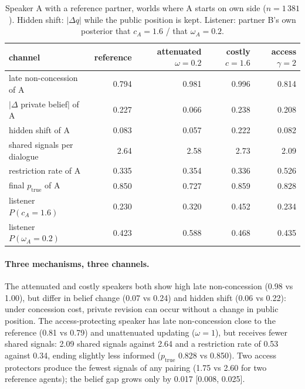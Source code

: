 \documentclass[runningheads]{llncs}
\newcommand{\Etrue}{p_{\mathrm{true}}}
\begin{document}
\begin{table}[t]
\centering\caption{Speaker A with a reference partner, worlds where A starts on own side ($n=1\,381$). Hidden shift: $|\Delta q|$ while the public position is kept. Listener: partner B's own posterior that $c_A=1.6$ / that $\omega_A=0.2$.}
\label{tab:channels}
\footnotesize
\begin{tabular}{@{}lrrrr@{}}
\toprule
channel & reference & attenuated $\omega{=}0.2$ & costly $c{=}1.6$ & access $\gamma{=}2$\\
\midrule
late non-concession of A & 0.794 & 0.981 & 0.996 & 0.814\\
$|\Delta$ private belief$|$ of A & 0.227 & 0.066 & 0.238 & 0.208\\
hidden shift of A & 0.083 & 0.057 & 0.222 & 0.082\\
shared signals per dialogue & 2.64 & 2.58 & 2.73 & 2.09\\
restriction rate of A & 0.335 & 0.354 & 0.336 & 0.526\\
final $\Etrue$ of A & 0.850 & 0.727 & 0.859 & 0.828\\
listener $P(c_A{=}1.6)$ & 0.230 & 0.320 & 0.452 & 0.234\\
listener $P(\omega_A{=}0.2)$ & 0.423 & 0.588 & 0.468 & 0.435\\
\bottomrule
\end{tabular}
\end{table}

\paragraph{Three mechanisms, three channels.} The attenuated and costly speakers both show high late non-concession (0.98 vs 1.00), but differ in belief change (0.07 vs 0.24) and hidden shift (0.06 vs 0.22): under concession cost, private revision can occur without a change in public position. The access-protecting speaker has late non-concession close to the reference (0.81 vs 0.79) and unattenuated updating ($\omega=1$), but receives fewer shared signals: 2.09 shared signals against 2.64 and a restriction rate of 0.53 against 0.34, ending slightly less informed ($\Etrue$ 0.828 vs 0.850). Two access protectors produce the fewest signals of any pairing (1.75 vs 2.60 for two reference agents); the belief gap grows only by 0.017 [0.008, 0.025].
\end{document}
